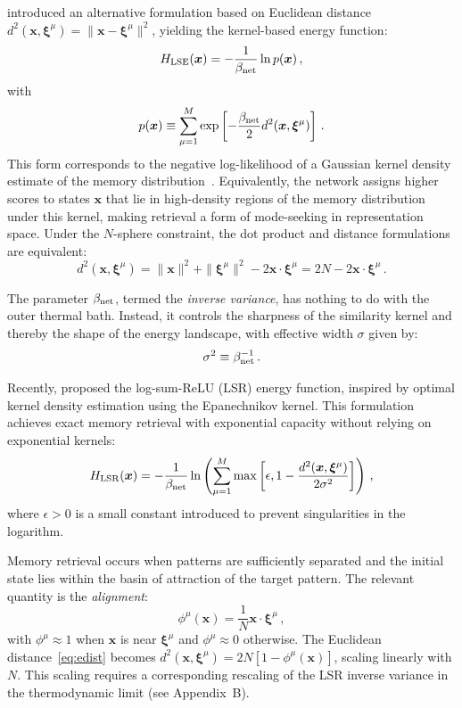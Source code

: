 \documentclass{article}
\theoremstyle{plain}
\theoremstyle{definition}
\theoremstyle{remark}
\begin{document}
\citet{krotov2021large} introduced an alternative formulation based on Euclidean distance $d^2(\bm{x}, \bm{\xi}^\mu) = \|\bm{x}-\bm{\xi}^\mu\|^2$, yielding the kernel-based energy function:
\begin{equation}
    H_{\rm LSE}(\bm{x}) = -\frac{1}{\beta_{\rm net}} \ln p(\bm{x}) \,,
    \label{eq:H_lse}
\end{equation}
with 
\begin{equation}
    p(\bm{x}) \equiv \sum_{\mu=1}^M \exp\left[ - \frac{\beta_{\rm net}}{2} d^2(\bm{x}, \bm{\xi}^\mu) \right] \,.
    \label{eq:dens}
\end{equation}
This form corresponds to the negative log-likelihood of a Gaussian kernel density estimate of the memory distribution~\citep{hoover2025dense}. Equivalently, the network assigns higher scores to states $\bm{x}$ that lie in high-density regions of the memory distribution under this kernel, making retrieval a form of mode-seeking in representation space. Under the $N$-sphere constraint, the dot product and distance formulations are equivalent:
\begin{equation}
    d^2(\bm{x}, \bm{\xi}^\mu) = \|\bm{x}\|^2 + \|\bm{\xi}^\mu\|^2 - 2\bm{x} \cdot \bm{\xi}^\mu = 2N - 2\bm{x} \cdot \bm{\xi}^\mu \,.
    \label{eq:edist}
\end{equation}

The parameter $\beta_{\rm net}$, termed the {\it inverse variance}, has nothing to do with the outer thermal bath. Instead, it controls the sharpness of the similarity kernel and thereby the shape of the energy landscape, with effective width $\sigma$ given by:
\begin{equation}
    \sigma^2 \equiv \beta_{\rm net}^{-1} \,.
\end{equation}

Recently, \citet{hoover2025dense} proposed the log-sum-ReLU (LSR) energy function, inspired by optimal kernel density estimation using the Epanechnikov kernel. This formulation achieves exact memory retrieval with exponential capacity without relying on exponential kernels:
\begin{equation}
    H_{\rm LSR}(\bm{x}) = -\frac{1}{\beta_{\rm net}} \ln \left( \sum_{\mu=1}^M \max\left[\epsilon,  1 - \frac{d^2(\bm{x},\bm{\xi}^\mu)}{2\sigma^2} \right] \right) \,,
    \label{eq:H_lsr}
\end{equation}
where $\epsilon > 0$ is a small constant introduced to prevent singularities in the logarithm.

Memory retrieval occurs when patterns are sufficiently separated and the initial state lies within the basin of attraction of the target pattern. The relevant quantity is the \textit{alignment}:
\begin{equation}
    \phi^\mu(\bm{x}) = \frac{1}{N} \bm{x} \cdot \bm{\xi}^\mu\,,
    \label{eq:alignment}
\end{equation}
with $\phi^\mu \approx 1$ when $\bm{x}$ is near $\bm{\xi}^\mu$ and $\phi^\mu \approx 0$ otherwise. The Euclidean distance~\eqref{eq:edist} becomes $d^2(\bm{x}, \bm{\xi}^\mu) = 2N[1 - \phi^\mu(\bm{x})]$, scaling linearly with $N$. This scaling requires a corresponding rescaling of the LSR inverse variance in the thermodynamic limit (see Appendix~B).
\end{document}
